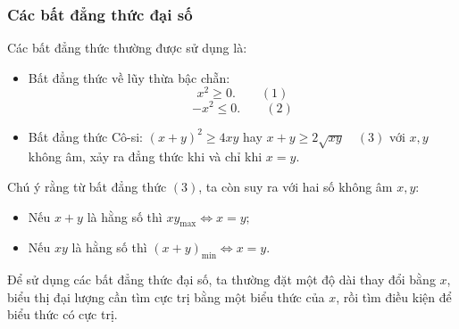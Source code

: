 \subsubsection{Các bất đẳng thức đại số}
Các bất đẳng thức thường được sử dụng là:
\begin{itemize}
	\item Bất đẳng thức về lũy thừa bậc chẵn:
	$$x^2 \geq 0. \quad \quad (1)$$
	$$-x^2 \leq 0. \quad \quad (2)$$
	\item Bất đẳng thức Cô-si: $\left(x+y \right)^2 \geq 4xy$ hay $x+y \geq 2 \sqrt{xy} \quad (3)$
	với $x, y$ không âm, xảy ra đẳng thức khi và chỉ khi $x=y$.
\end{itemize}
Chú ý rằng từ bất đẳng thức $(3)$, ta còn suy ra với hai số không âm $x, y:$
\begin{itemize}
	\item Nếu $x+y$ là hằng số thì $xy_\text{max} \Leftrightarrow x=y;$
	\item Nếu $xy$ là hằng số thì $\left(x+y\right)_\text{min} \Leftrightarrow x=y.$
\end{itemize}
Để sử dụng các bất đẳng thức đại số, ta thường đặt một độ dài thay đổi bằng $x$, biểu thị đại lượng cần tìm cực trị bằng một biểu thức của $x$, rồi tìm điều kiện để biểu thức có cực trị.
